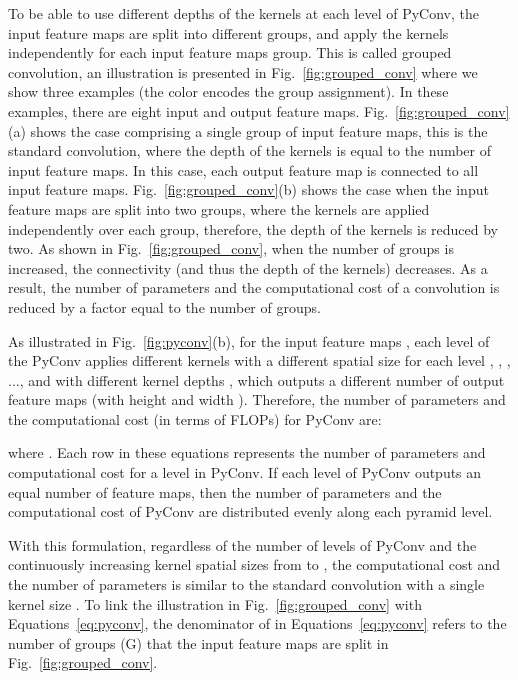 \documentclass{article}
\begin{document}
\vspace{-0.15in}
To be able to use different depths of the kernels at each level of PyConv, the input feature maps  are split into different groups, and apply the kernels independently for each input feature maps group. This is called grouped convolution,  an illustration is presented in Fig.~\ref{fig:grouped_conv}  where we show three examples (the color encodes the group assignment). In these examples, there are eight input and output feature maps. Fig.~\ref{fig:grouped_conv}(a) shows the case comprising a single group of input feature maps, this is the standard convolution, where the depth of the kernels is equal to the number of input feature maps.  In this case, each output feature map is connected to all input feature maps.  Fig.~\ref{fig:grouped_conv}(b) shows the case when the input feature maps are split into two groups, where the kernels are applied independently over each group, therefore, the depth of the kernels is reduced by two. As shown in  Fig.~\ref{fig:grouped_conv},  when the number of groups is increased,  the connectivity (and thus the depth of the kernels) decreases. As a result, the number of parameters and the computational cost of a convolution is reduced by a factor equal to the number of groups.




As illustrated in Fig.~\ref{fig:pyconv}(b), for the input feature maps , each level of the PyConv  applies different kernels with a different spatial size for each level , , , ...,   and  with different kernel depths  \scalebox{0.8}{, , , ...,  }, which outputs a different number of output feature maps \scalebox{0.8}{,  , , ..., }  (with height  and width ).  Therefore, the number of parameters and the computational cost (in terms of FLOPs) for PyConv are:
\renewcommand{\arraystretch}{0.5}
\noindent\begin{minipage}{.4\textwidth}

\end{minipage}

\noindent\begin{minipage}{.5\textwidth}
where \scalebox{0.8}{}. Each row in these equations represents the number of parameters and computational cost for a level in PyConv. 
If each level of PyConv outputs an equal number of feature maps, then the number of parameters and the computational cost of PyConv are distributed evenly along each pyramid level.
\end{minipage}
\vspace{-1pt}
With this formulation, regardless of the number of levels of PyConv and the continuously increasing kernel spatial sizes from  to ,  the computational cost and the number of parameters is similar to the standard convolution with a single  kernel size .
To link the illustration in  Fig.~\ref{fig:grouped_conv} with Equations~\ref{eq:pyconv}, the denominator of  in Equations~\ref{eq:pyconv} refers to the number of groups (G) that the input feature maps  are split in Fig.~\ref{fig:grouped_conv}.
\end{document}
